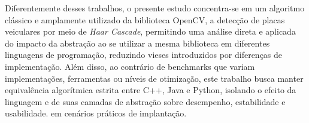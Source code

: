 Diferentemente desses trabalhos, o presente estudo concentra-se em um algoritmo clássico e amplamente utilizado da biblioteca OpenCV, a detecção de placas veiculares por meio de \textit{Haar Cascade}, permitindo uma análise direta e aplicada do impacto da abstração ao se utilizar a mesma biblioteca em diferentes linguagens de programação, reduzindo vieses introduzidos por diferenças de implementação. Além disso, ao contrário de benchmarks que variam implementações, ferramentas ou níveis de otimização, este trabalho busca manter equivalência algorítmica estrita entre C++, Java e Python, isolando o efeito da linguagem e de suas camadas de abstração sobre desempenho, estabilidade e usabilidade.
 em cenários práticos de implantação.

